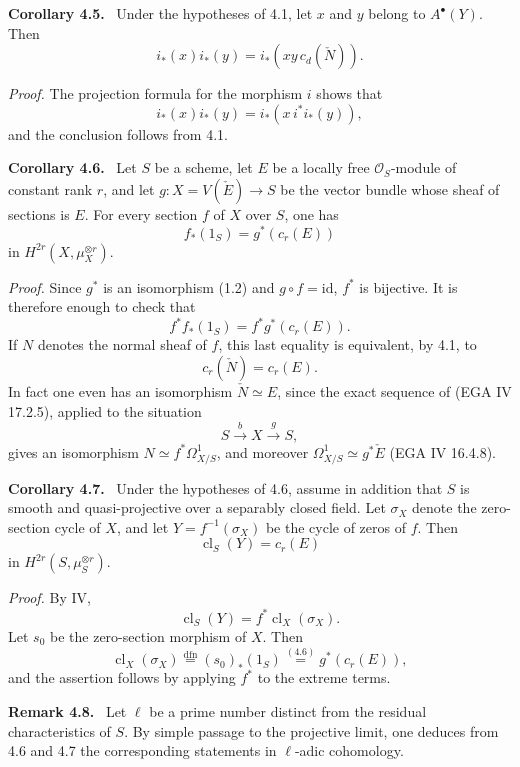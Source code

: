 \documentclass[11pt]{article}
\newenvironment{statement}[1]{\par\medskip\noindent\textbf{#1.}\ }{\par\medskip}
\providecommand{\cl}{\operatorname{cl}}
\providecommand{\cl}{\operatorname{cl}}
\providecommand{\cl}{\operatorname{cl}}
\begin{document}
\begin{statement}{Corollary 4.5}
Under the hypotheses of 4.1, let $x$ and $y$ belong to $A^\bullet(Y)$. Then
\[
i_*(x)i_*(y)=i_*(xy\,c_d(\check N)).
\]
\end{statement}

\emph{Proof.} The projection formula for the morphism $i$ shows that
\[
i_*(x)i_*(y)=i_*(x\,i^*i_*(y)),
\]
and the conclusion follows from 4.1.

\begin{statement}{Corollary 4.6}
Let $S$ be a scheme, let $E$ be a locally free $\mathcal O_S$-module of constant rank $r$, and let $g:X=V(\check E)\to S$ be the vector bundle whose sheaf of sections is $E$. For every section $f$ of $X$ over $S$, one has
\[
f_*(1_S)=g^*(c_r(E))
\]
in $H^{2r}(X,\mu_X^{\otimes r})$.
\end{statement}

\emph{Proof.} Since $g^*$ is an isomorphism (1.2) and $g\circ f=\mathrm{id}$, $f^*$ is bijective. It is therefore enough to check that
\[
f^*f_*(1_S)=f^*g^*(c_r(E)).
\]
If $N$ denotes the normal sheaf of $f$, this last equality is equivalent, by 4.1, to
\[
c_r(\check N)=c_r(E).
\]
In fact one even has an isomorphism $\check N\simeq E$, since the exact sequence of (EGA IV 17.2.5), applied to the situation
\[
S\xrightarrow{b} X\xrightarrow{g} S,
\]
gives an isomorphism $N\simeq f^*\Omega^1_{X/S}$, and moreover $\Omega^1_{X/S}\simeq g^*\check E$ (EGA IV 16.4.8).

\begin{statement}{Corollary 4.7}
Under the hypotheses of 4.6, assume in addition that $S$ is smooth and quasi-projective over a separably closed field. Let $\sigma_X$ denote the zero-section cycle of $X$, and let $Y=f^{-1}(\sigma_X)$ be the cycle of zeros of $f$. Then
\[
\cl_S(Y)=c_r(E)
\]
in $H^{2r}(S,\mu_S^{\otimes r})$.
\end{statement}

\emph{Proof.} By IV,
\[
\cl_S(Y)=f^*\cl_X(\sigma_X).
\]
Let $s_0$ be the zero-section morphism of $X$. Then
\[
\cl_X(\sigma_X)\stackrel{\mathrm{dfn}}{=}(s_0)_*(1_S)\stackrel{(4.6)}{=}g^*(c_r(E)),
\]
and the assertion follows by applying $f^*$ to the extreme terms.

\begin{statement}{Remark 4.8}
Let $\ell$ be a prime number distinct from the residual characteristics of $S$. By simple passage to the projective limit, one deduces from 4.6 and 4.7 the corresponding statements in $\ell$-adic cohomology.
\end{statement}
\end{document}
